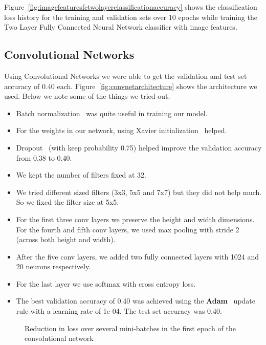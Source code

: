 Figure~\ref{fig:imagefeaturesfctwolayerclassificationaccuracy} shows the classification loss history for the training and validation sets over 10 epochs while training the Two Layer Fully Connected Neural Network classifier with image features.

\subsection{Convolutional Networks}
\label{subsec:convolutionalnetworks}

Using Convolutional Networks we were able to get the validation and test set accuracy of 0.40 each. Figure~\ref{fig:convnetarchitecture} shows the architecture we used. Below we note some of the things we tried out.

\begin{itemize}[noitemsep]
\item Batch normalization~\cite{ioffe2015batch} was quite useful in training our model.
\item For the weights in our network, using Xavier initialization~\cite{glorot2010understanding} helped.
\item Dropout~\cite{hinton2012improving, srivastava2014dropout} (with keep probability 0.75) helped improve the validation accuracy from 0.38 to 0.40. 
\item We kept the number of filters fixed at 32. 
\item We tried different sized filters (3x3, 5x5 and 7x7) but they did not help much. So we fixed the filter size at 5x5.
\item For the first three conv layers we preserve the height and width dimensions. For the fourth and fifth conv layers, we used max pooling with stride 2 (across both height and width).
\item After the five conv layers, we added two fully connected layers with 1024 and 20 neurons respectively. 
\item For the last layer we use softmax with cross entropy loss. 
\item The best validation accuracy of 0.40 was achieved using the \textbf{Adam}~\cite{kingma2014adam} update rule with a learning rate of 1e-04. The test set accuracy was 0.40. 
\end{itemize}

\begin{figure}[h!]
\centering
  \caption{Reduction in loss over several mini-batches in the first epoch of the convolutional network}
  \label{fig:lossepoch1}
\end{figure}

